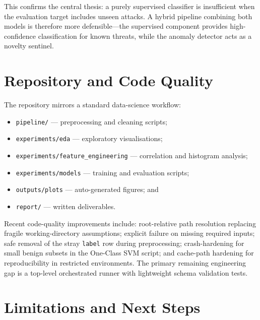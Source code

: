 \documentclass[10pt,conference]{IEEEtran}
\begin{document}
This confirms the central thesis: a purely supervised classifier is
insufficient when the evaluation target includes unseen attacks. A
hybrid pipeline combining both models is therefore more defensible—the
supervised component provides high-confidence classification for known
threats, while the anomaly detector acts as a novelty sentinel.

\section{Repository and Code Quality}
\label{sec:repo}

The repository mirrors a standard data-science workflow:

\begin{itemize}[leftmargin=*,noitemsep]
  \item \texttt{pipeline/} — preprocessing and cleaning scripts;
  \item \texttt{experiments/eda} — exploratory visualisations;
  \item \texttt{experiments/feature\_engineering} — correlation and
        histogram analysis;
  \item \texttt{experiments/models} — training and evaluation scripts;
  \item \texttt{outputs/plots} — auto-generated figures; and
  \item \texttt{report/} — written deliverables.
\end{itemize}

Recent code-quality improvements include: root-relative path resolution
replacing fragile working-directory assumptions; explicit failure on
missing required inputs; safe removal of the stray \texttt{label} row
during preprocessing; crash-hardening for small benign subsets in the
One-Class SVM script; and cache-path hardening for reproducibility in
restricted environments. The primary remaining engineering gap is a
top-level orchestrated runner with lightweight schema validation tests.

\section{Limitations and Next Steps}
\label{sec:limits}
\end{document}
